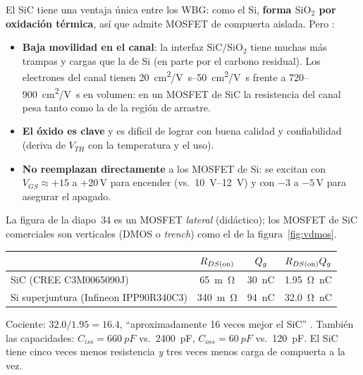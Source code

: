 El SiC tiene una ventaja única entre los WBG: como el Si, \textbf{forma $\mathrm{SiO_2}$ por oxidación
térmica}, así que admite MOSFET de compuerta aislada. Pero :
\begin{itemize}
  \item \textbf{Baja movilidad en el canal}: la interfaz $\mathrm{SiC/SiO_2}$ tiene muchas más trampas y
  cargas que la de Si (en parte por el carbono residual). Los electrones del canal tienen
  \SIrange{20}{50}{cm^2/V.s} frente a 720--\SI{900}{cm^2/V.s} en volumen: en un MOSFET de SiC la
  resistencia del canal pesa tanto como la de la región de arrastre.
  \item \textbf{El óxido es clave} y es difícil de lograr con buena calidad y confiabilidad (deriva de
  $V_{TH}$ con la temperatura y el uso).
  \item \textbf{No reemplazan directamente} a los MOSFET de Si: se excitan con $V_{GS}\approx+15$ a
  $+20$\,V para encender (vs.\ \SIrange{10}{12}{V}) y con $-3$ a $-5$\,V para asegurar el apagado.
\end{itemize}
La figura de la diapo~34 es un MOSFET \emph{lateral} (didáctico); los MOSFET de SiC comerciales son
verticales (DMOS o \emph{trench}) como el de la figura~\ref{fig:vdmos}.

\begin{ejemplo}
\begin{center}\small
\begin{tabular}{lccc}
\toprule
 & $R_{DS(\mathrm{on})}$ & $Q_{g}$ & $R_{DS(\mathrm{on})}Q_{g}$ \\
\midrule
SiC (CREE C3M0065090J) & \SI{65}{m\ohm} & \SI{30}{nC} & \SI{1.95}{\ohm.nC} \\
Si superjuntura (Infineon IPP90R340C3) & \SI{340}{m\ohm} & \SI{94}{nC} & \SI{32.0}{\ohm.nC} \\
\bottomrule
\end{tabular}
\end{center}
Cociente: $32.0/1.95=16.4$, ``aproximadamente 16 veces mejor el SiC'' . También las
capacidades: $C_{iss}=\SI{660}{pF}$ vs.\ \SI{2400}{pF}, $C_{oss}=\SI{60}{pF}$ vs.\ \SI{120}{pF}. El SiC
tiene cinco veces menos resistencia \emph{y} tres veces menos carga de compuerta a la vez.
\end{ejemplo}
